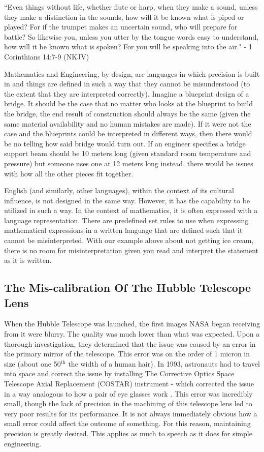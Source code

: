 \documentclass[10pt, a4paper, twocolumn]{book}
\begin{document}
\begin{formal}
	 ``Even things without life, whether flute or harp, when they make a sound, unless they make a distinction in the sounds, how will it be known what is piped or played? For if the trumpet makes an uncertain sound, who will prepare for battle? So likewise you, unless you utter by the tongue words easy to understand, how will it be known what is spoken? For you will be speaking into the air." - 1 Corinthians 14:7-9 (NKJV)
\end{formal}

Mathematics and Engineering, by design, are languages in which precision is built in and things are defined in such a way that they cannot be misunderstood (to the extent that they are interpreted correctly). Imagine a blueprint design of a bridge. It should be the case that no matter who looks at the blueprint to build the bridge, the end result of construction should always be the same (given the same material availability and no human mistakes are made). If it were not the case and the blueprints could be interpreted in different ways, then there would be no telling how said bridge would turn out. If an engineer specifies a bridge support beam should be 10 meters long (given standard room temperature and pressure) but someone uses one at 12 meters long instead, there would be issues with how all the other pieces fit together. 

English (and similarly, other languages), within the context of its cultural influence, is not designed in the same way. However, it has the capability to be utilized in such a way. In the context of mathematics, it is often expressed with a language representation. There are predefined set rules to use when expressing mathematical expressions in a written language that are defined such that it cannot be misinterpreted. With our example above about not getting ice cream, there is no room for misinterpretation given you read and interpret the statement as it is written.

\subsection{The Mis-calibration Of The Hubble Telescope Lens}

When the Hubble Telescope was launched, the first images NASA began receiving from it were blurry. The quality was much lower than what was expected. Upon a thorough investigation, they determined that the issue was caused by an error in the primary mirror of the telescope. This error was on the order of 1 micron in size (about one 50$^{\text{th}}$ the width of a human hair). In 1993, astronauts had to travel into space and correct the issue by installing The Corrective Optics Space Telescope Axial Replacement (COSTAR) instrument - which corrected the issue in a way analogous to how a pair of eye glasses work \citep{HubbleMirrorFlaw}. This error was incredibly small, though the lack of precision in the machining of this telescope lens led to very poor results for its performance. It is not always immediately obvious how a small error could affect the outcome of something. For this reason, maintaining precision is greatly desired. This applies as much to speech as it does for simple engineering.
\end{document}
